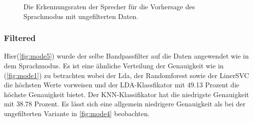 \begin{figure}[H]
\caption{Die Erkennungsraten der Sprecher  für die Vorhersage des Sprachmodus mit ungefilterten Daten.}
\label{fig:cnfsunfiltered}
\end{figure}

\subsubsection{Filtered}
Hier(\ref{fig:mode5}) wurde der selbe Bandpassfilter auf die Daten angewendet wie in dem Sprachmodus. Es ist eine ähnliche Verteilung der Genauigkeit wie in (\ref{fig:mode1}) zu betrachten wobei der Lda, der Randomforest sowie der LinerSVC die höchsten Werte vorweisen und der LDA-Klassfikator mit 49.13 Prozent die höchste Genauigkeit bietet. Der KNN-Klassifikator hat die niedrigste Genauigkeit mit 38.78 Prozent. Es lässt sich eine allgemein niedrigere Genauigkeit als bei der ungefilterten Variante in \ref{fig:mode4} beobachten.


